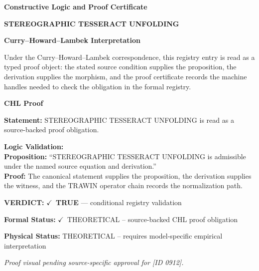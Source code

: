 \clearpage
\begingroup\tzpsupportsetup
\noindent\textbf{\fontsize{10.8pt}{12.8pt}\selectfont [ID 0912] Constructive Logic and Proof Certificate}\par
\noindent\textbf{\fontsize{10pt}{12pt}\selectfont STEREOGRAPHIC TESSERACT UNFOLDING}\par
\vspace{0.45em}
\begingroup
\footnotesize
\setlength{\parskip}{0.22em}
\setlength{\parindent}{0pt}
\noindent\textbf{Curry--Howard--Lambek Interpretation}\par
Under the Curry--Howard--Lambek correspondence, this registry entry is read as a typed proof
object: the stated source condition supplies the proposition, the derivation supplies the
morphism, and the proof certificate records the machine handles needed to check the obligation
in the formal registry.

\vspace{0.45em}
\noindent\textbf{CHL Proof}\par
\textbf{Statement:} STEREOGRAPHIC TESSERACT UNFOLDING is read as a source-backed proof obligation.

\textbf{Logic Validation:}\\
\textbf{Proposition:} ``STEREOGRAPHIC TESSERACT UNFOLDING is admissible under the named source equation and derivation.''\\
\textbf{Proof:} The canonical statement supplies the proposition, the derivation supplies the witness, and the TRAWIN operator chain records the normalization path.

\textbf{VERDICT:} \ensuremath{\checkmark}\ \textbf{TRUE} --- conditional registry validation

\textbf{Formal Status:} \ensuremath{\checkmark}\ THEORETICAL -- source-backed CHL proof obligation

\textbf{Physical Status:} THEORETICAL -- requires model-specific empirical interpretation
\par\vspace{0.45em}
\par
\vfill
\begingroup\footnotesize\itshape
Proof visual pending source-specific approval for [ID 0912].
\par\endgroup
\vfill
\endgroup
\endgroup
